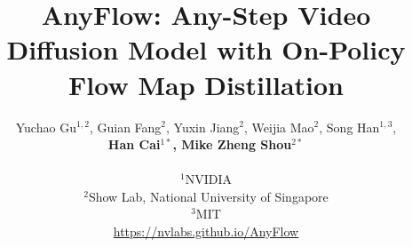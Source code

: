 \documentclass[10pt, logo, copyright]{nv}
\title{
  AnyFlow: Any-Step Video Diffusion Model with On-Policy Flow Map Distillation
}
\author{
  {\small Yuchao Gu$^{1,2}$, Guian Fang$^{2}$, Yuxin Jiang$^{2}$, Weijia Mao$^{2}$, Song Han$^{1,3}$,} \\ {\small \textbf{Han Cai$^{1*}$, Mike Zheng Shou$^{2*}$}} \\~\\
  $^{1}$NVIDIA \\
  $^{2}$Show Lab, National University of Singapore \\
  $^{3}$MIT\\
  \url{https://nvlabs.github.io/AnyFlow}
}
\begin{document}
\maketitle


 
 


{
  \small
  
  
}

\clearpage
\end{document}
